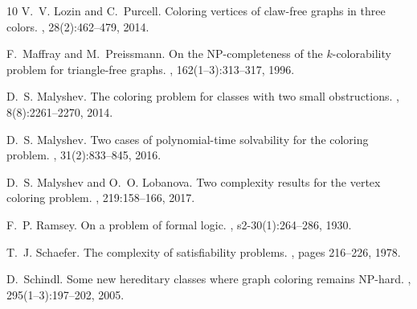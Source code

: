 \documentclass{llncs}
\begin{document}
\begin{thebibliography}{10}
V.~V. Lozin and C.~Purcell.
\newblock Coloring vertices of claw-free graphs in three colors.
, 28(2):462--479, 2014.

F.~Maffray and M.~Preissmann.
\newblock On the {NP-completeness} of the $k$-colorability problem for
  triangle-free graphs.
, 162(1--3):313--317, 1996.

D.~S. Malyshev.
\newblock The coloring problem for classes with two small obstructions.
, 8(8):2261--2270, 2014.

D.~S. Malyshev.
\newblock Two cases of polynomial-time solvability for the coloring problem.
, 31(2):833--845, 2016.

D.~S. Malyshev and O.~O. Lobanova.
\newblock Two complexity results for the vertex coloring problem.
, 219:158--166, 2017.

F.~P. Ramsey.
\newblock On a problem of formal logic.
,
  s2-30(1):264--286, 1930.

T.~J. Schaefer.
\newblock The complexity of satisfiability problems.
, pages 216--226, 1978.

D.~Schindl.
\newblock Some new hereditary classes where graph coloring remains {NP-hard}.
, 295(1--3):197--202, 2005.

\end{thebibliography}
\end{document}
